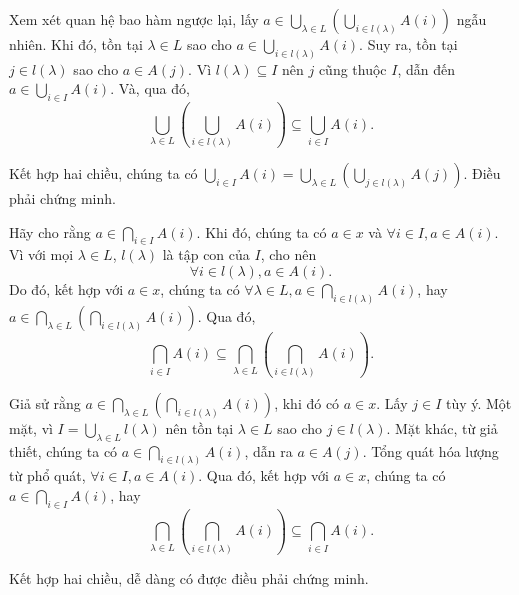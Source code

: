 Xem xét quan hệ bao hàm ngược lại, lấy $a \in \bigcup_{\lambda \in L} \left(\bigcup_{i \in l(\lambda)} A(i)\right)$ ngẫu nhiên. Khi đó, tồn tại $\lambda \in L$ sao cho $a \in \bigcup_{i \in l(\lambda)} A(i)$. Suy ra, tồn tại $j \in l(\lambda)$ sao cho $a \in A(j)$. Vì $l(\lambda) \subseteq I$ nên $j$ cũng thuộc $I$, dẫn đến $a \in \bigcup_{i \in I} A(i)$. Và, qua đó, \begin{equation*}
   \bigcup_{\lambda \in L} \left(\bigcup_{i \in l(\lambda)} A(i)\right) \subseteq \bigcup_{i \in I} A(i).
\end{equation*} 

Kết hợp hai chiều, chúng ta có $\bigcup_{i \in I} A(i) = \bigcup_{\lambda \in L} \left(\bigcup_{j \in l(\lambda)} A(j)\right)$. Điều phải chứng minh.

\stepSubexercise Hãy cho rằng $a \in \bigcap_{i \in I} A(i)$. Khi đó, chúng ta có $a \in x$ và $\forall i \in I, a \in A(i)$.
Vì với mọi $\lambda \in L$, $l(\lambda)$ là tập con của $I$, cho nên $$\forall i \in l(\lambda), a \in A(i).$$
Do đó, kết hợp với $a \in x$, chúng ta có $\forall \lambda \in L, a \in \bigcap_{i \in l(\lambda)} A(i)$, hay $a \in \bigcap_{\lambda \in L}\left(\bigcap_{i \in l(\lambda)} A(i)\right)$. Qua đó, \begin{equation*}
   \bigcap_{i \in I} A(i) \subseteq \bigcap_{\lambda \in L} \left(\bigcap_{i \in l(\lambda)} A(i)\right).
\end{equation*}

Giả sử rằng $a \in \bigcap_{\lambda \in L} \left(\bigcap_{i \in l(\lambda)} A(i)\right)$, khi đó có $a \in x$. Lấy $j \in I$ tùy ý. Một mặt, vì $I = \bigcup_{\lambda \in L} l(\lambda)$ nên tồn tại $\lambda \in L$ sao cho $j \in l(\lambda)$. Mặt khác, từ giả thiết, chúng ta có $a \in \bigcap_{i \in l(\lambda)} A(i)$, dẫn ra $a \in A(j)$. Tổng quát hóa lượng từ phổ quát, $\forall i \in I, a \in A(i).$
Qua đó, kết hợp với $a \in x$, chúng ta có $a \in \bigcap_{i \in I}A(i)$, hay $$
   \bigcap_{\lambda \in L} \left(\bigcap_{i \in l(\lambda)} A(i)\right) \subseteq \bigcap_{i \in I} A(i).
$$

Kết hợp hai chiều, dễ dàng có được điều phải chứng minh.

